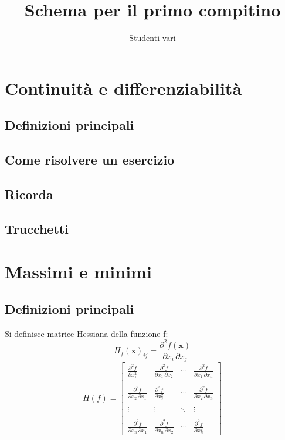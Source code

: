 \documentclass[a4paper,10pt]{book}
\author{Studenti vari}
\title{Schema per il primo compitino}
\begin{document}
\maketitle

\section{Continuità e differenziabilità}
\subsection{Definizioni principali}

\subsection{Come risolvere un esercizio}

\subsection{Ricorda}
\subsection{Trucchetti}

\section{Massimi e minimi}
\subsection{Definizioni principali}
Si definisce matrice Hessiana della funzione f:
$$  H_{f}(\mathbf{x})_{ij} = \frac{\partial^2 f(\mathbf{x})}{\partial x_i\, \partial x_j} $$
$$ H(f) = \begin{bmatrix} \frac{\partial^2 f}{\partial x_1^2} & \frac{\partial^2 f}{\partial x_1\,\partial x_2} & \cdots & \frac{\partial^2 f}{\partial x_1\,\partial x_n} \\ \\ \frac{\partial^2 f}{\partial x_2\,\partial x_1} & \frac{\partial^2 f}{\partial x_2^2} & \cdots & \frac{\partial^2 f}{\partial x_2\,\partial x_n} \\ \\ \vdots & \vdots & \ddots & \vdots \\ \\ \frac{\partial^2 f}{\partial x_n\,\partial x_1} & \frac{\partial^2 f}{\partial x_n\,\partial x_2} & \cdots & \frac{\partial^2 f}{\partial x_n^2} \end{bmatrix}$$
\end{document}
